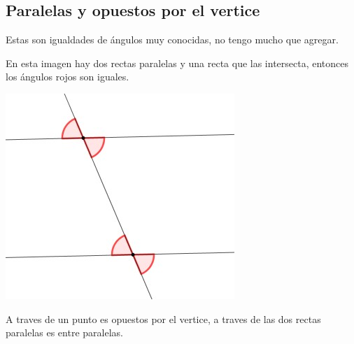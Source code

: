 \documentclass[11pt]{scrartcl}
\begin{document}
\subsection{Paralelas y opuestos por el vertice}
Estas son igualdades de \'angulos muy conocidas, no tengo mucho que agregar.
\begin{proposition}
    
    En esta imagen hay dos rectas paralelas y una recta que las intersecta, entonces los \'angulos rojos son iguales.
    \begin{center}
    \includegraphics[scale=.5]{AC2.jpg}
    \end{center}
    A traves de un punto es opuestos por el vertice, a traves de las dos rectas paralelas es entre paralelas.
\end{proposition}
\end{document}
